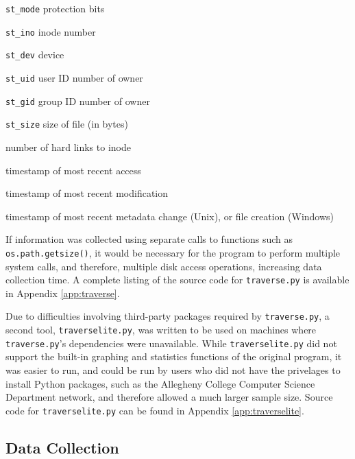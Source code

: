 \documentclass[12pt,a4paper]{article}
\begin{document}
			\begin{description}[leftmargin=3cm, style=sameline]
				\begin{multicols}{2}
					\item[\texttt{st\_mode}]{protection bits}
					\item[\texttt{st\_ino}]{inode number}
					\item[\texttt{st\_dev}]{device}
					\item[\texttt{st\_uid}]{user ID number of owner}
					\item[\texttt{st\_gid}]{group ID number of owner}
					\item[\texttt{st\_size}]{size of file (in bytes)}
				\end{multicols}
				\item[\texttt{st\_nlink}]{number of hard links to inode}
				\item[\texttt{st\_atime}]{timestamp of most recent access}
				\item[\texttt{st\_mtime}]{timestamp of most recent modification}
				\item[\texttt{st\_ctime}]{timestamp of most recent metadata change (Unix), or file creation (Windows)}
			\end{description}

			If information was collected using separate calls to functions such as \texttt{os.path.getsize()}, it would be necessary for the program to perform multiple system calls, and therefore, multiple disk access operations, increasing data collection time. 
			A complete listing of the source code for \texttt{traverse.py} is available in Appendix \ref{app:traverse}.

			Due to difficulties involving third-party packages required by \texttt{traverse.py}, a second tool, \texttt{traverselite.py}, was written to be used on machines where \texttt{traverse.py}'s dependencies were unavailable. While \texttt{traverselite.py} did not support the built-in graphing and statistics functions of the original program, it was easier to run, and could be run by users who did not have the privelages to install Python packages, such as the Allegheny College Computer Science Department network, and therefore allowed a much larger sample size. Source code for \texttt{traverselite.py} can be found in Appendix \ref{app:traverselite}.

		\subsection{Data Collection}
\end{document}
